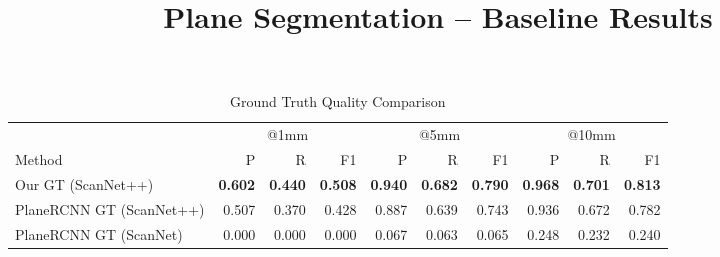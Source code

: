 \documentclass[10pt]{article}
\begin{document}
\title{Plane Segmentation -- Baseline Results}
\maketitle

\begin{table}[t]
\centering
\caption{Ground Truth Quality Comparison}
\label{tab:gt_quality}
\begin{tabular}{l r r r r r r r r r}
\toprule
\multicolumn{1}{l}{} & \multicolumn{3}{c}{@1mm} & \multicolumn{3}{c}{@5mm} & \multicolumn{3}{c}{@10mm} \\
\cmidrule(lr){2-4} \cmidrule(lr){5-7} \cmidrule(lr){8-10}
Method & P & R & F1 & P & R & F1 & P & R & F1 \\
\midrule
Our GT (ScanNet++) & \textbf{0.602} & \textbf{0.440} & \textbf{0.508} & \textbf{0.940} & \textbf{0.682} & \textbf{0.790} & \textbf{0.968} & \textbf{0.701} & \textbf{0.813} \\
PlaneRCNN GT (ScanNet++) & 0.507 & 0.370 & 0.428 & 0.887 & 0.639 & 0.743 & 0.936 & 0.672 & 0.782 \\
PlaneRCNN GT (ScanNet) & 0.000 & 0.000 & 0.000 & 0.067 & 0.063 & 0.065 & 0.248 & 0.232 & 0.240 \\
\bottomrule
\end{tabular}
\end{table}

\clearpage
\end{document}
